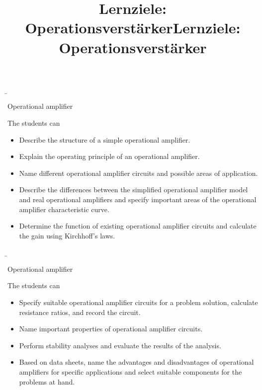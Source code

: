 \begin{frame}
    \b{
        \begin{Learning objectives}{Operational amplifier}
            \title{Lernziele: Operationsverstärker}
            The students can
            \begin{itemize}
                \item Describe the structure of a simple operational amplifier.
                \item Explain the operating principle of an operational amplifier. 
                \item Name different operational amplifier circuits and possible areas of application. 
                \item Describe the differences between the simplified operational amplifier model and real operational amplifiers and specify important areas of the operational amplifier characteristic curve.
                \item Determine the function of existing operational amplifier circuits and calculate the gain using Kirchhoff's laws.            \end{itemize}
        \end{Learning objectives}    
    }





    
\end{frame}

\begin{frame}
\b{
    \begin{Learning objectives}{Operational amplifier}
        \title{Lernziele: Operationsverstärker}
        The students can
        \begin{itemize}
            \item Specify suitable operational amplifier circuits for a problem solution, calculate resistance ratios, and record the circuit.
            \item Name important properties of operational amplifier circuits.
            \item Perform stability analyses and evaluate the results of the analysis.
            \item Based on data sheets, name the advantages and disadvantages of operational amplifiers for specific applications and select suitable components for the problems at hand.
        \end{itemize}
    \end{Learning objectives}    
}
\end{frame}

